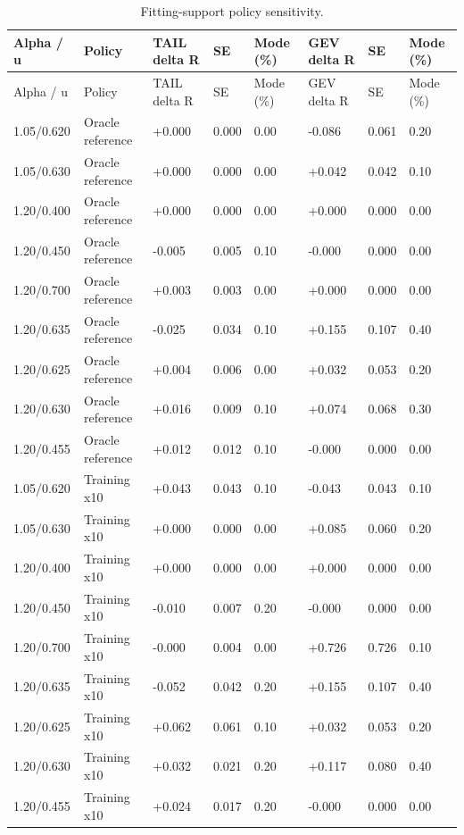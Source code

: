 \begingroup
\fontsize{8.5}{10.5}\selectfont\setlength{\tabcolsep}{3pt}
\begin{longtable}{@{}llllllll@{}}
\caption{Fitting-support policy sensitivity.}\label{tab:final-si-11}\\
\toprule
Alpha / u & Policy & TAIL delta R & SE & Mode (\%) & GEV delta R & SE & Mode (\%)\\\midrule\endfirsthead
Alpha / u & Policy & TAIL delta R & SE & Mode (\%) & GEV delta R & SE & Mode (\%)\\\midrule\endhead
1.05/0.620 & Oracle reference & +0.000 & 0.000 & 0.00 & -0.086 & 0.061 & 0.20\\
1.05/0.630 & Oracle reference & +0.000 & 0.000 & 0.00 & +0.042 & 0.042 & 0.10\\
1.20/0.400 & Oracle reference & +0.000 & 0.000 & 0.00 & +0.000 & 0.000 & 0.00\\
1.20/0.450 & Oracle reference & -0.005 & 0.005 & 0.10 & -0.000 & 0.000 & 0.00\\
1.20/0.700 & Oracle reference & +0.003 & 0.003 & 0.00 & +0.000 & 0.000 & 0.00\\
1.20/0.635 & Oracle reference & -0.025 & 0.034 & 0.10 & +0.155 & 0.107 & 0.40\\
1.20/0.625 & Oracle reference & +0.004 & 0.006 & 0.00 & +0.032 & 0.053 & 0.20\\
1.20/0.630 & Oracle reference & +0.016 & 0.009 & 0.10 & +0.074 & 0.068 & 0.30\\
1.20/0.455 & Oracle reference & +0.012 & 0.012 & 0.10 & -0.000 & 0.000 & 0.00\\
1.05/0.620 & Training x10 & +0.043 & 0.043 & 0.10 & -0.043 & 0.043 & 0.10\\
1.05/0.630 & Training x10 & +0.000 & 0.000 & 0.00 & +0.085 & 0.060 & 0.20\\
1.20/0.400 & Training x10 & +0.000 & 0.000 & 0.00 & +0.000 & 0.000 & 0.00\\
1.20/0.450 & Training x10 & -0.010 & 0.007 & 0.20 & -0.000 & 0.000 & 0.00\\
1.20/0.700 & Training x10 & -0.000 & 0.004 & 0.00 & +0.726 & 0.726 & 0.10\\
1.20/0.635 & Training x10 & -0.052 & 0.042 & 0.20 & +0.155 & 0.107 & 0.40\\
1.20/0.625 & Training x10 & +0.062 & 0.061 & 0.10 & +0.032 & 0.053 & 0.20\\
1.20/0.630 & Training x10 & +0.032 & 0.021 & 0.20 & +0.117 & 0.080 & 0.40\\
1.20/0.455 & Training x10 & +0.024 & 0.017 & 0.20 & -0.000 & 0.000 & 0.00\\

\end{longtable}
